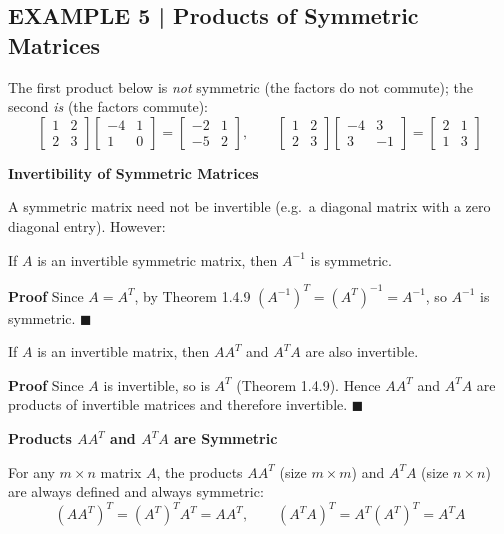 \documentclass{article}
\newcommand{\redheading}[1]{{\vspace{2mm}\noindent\Large\bfseries\color{red!55!black} #1\par}\vspace{2mm}}
\theoremstyle{mystyle}
\begin{document}
\subsection*{EXAMPLE 5 | Products of Symmetric Matrices}
The first product below is \emph{not} symmetric (the factors do not commute); the second \emph{is} (the factors commute):
\[
\begin{bmatrix}1&2\\2&3\end{bmatrix}\begin{bmatrix}-4&1\\1&0\end{bmatrix}=\begin{bmatrix}-2&1\\-5&2\end{bmatrix},\qquad
\begin{bmatrix}1&2\\2&3\end{bmatrix}\begin{bmatrix}-4&3\\3&-1\end{bmatrix}=\begin{bmatrix}2&1\\1&3\end{bmatrix}
\]

\redheading{Invertibility of Symmetric Matrices}

A symmetric matrix need not be invertible (e.g.\ a diagonal matrix with a zero diagonal entry). However:

\begin{tcolorbox}[colback=red!4, colframe=red!60!black, title=Theorem 1.7.4, boxrule=0.5mm, arc=3mm]
If $A$ is an invertible symmetric matrix, then $A^{-1}$ is symmetric.
\end{tcolorbox}
\textbf{Proof} Since $A=A^T$, by Theorem 1.4.9 $(A^{-1})^T=(A^T)^{-1}=A^{-1}$, so $A^{-1}$ is symmetric. $\blacksquare$

\begin{tcolorbox}[colback=red!4, colframe=red!60!black, title=Theorem 1.7.5, boxrule=0.5mm, arc=3mm]
If $A$ is an invertible matrix, then $AA^T$ and $A^TA$ are also invertible.
\end{tcolorbox}
\textbf{Proof} Since $A$ is invertible, so is $A^T$ (Theorem 1.4.9). Hence $AA^T$ and $A^TA$ are products of invertible matrices and therefore invertible. $\blacksquare$

\redheading{Products $AA^T$ and $A^TA$ are Symmetric}

For any $m\times n$ matrix $A$, the products $AA^T$ (size $m\times m$) and $A^TA$ (size $n\times n$) are always defined and always symmetric:
\[
(AA^T)^T=(A^T)^TA^T=AA^T,\qquad (A^TA)^T=A^T(A^T)^T=A^TA
\]
\end{document}
